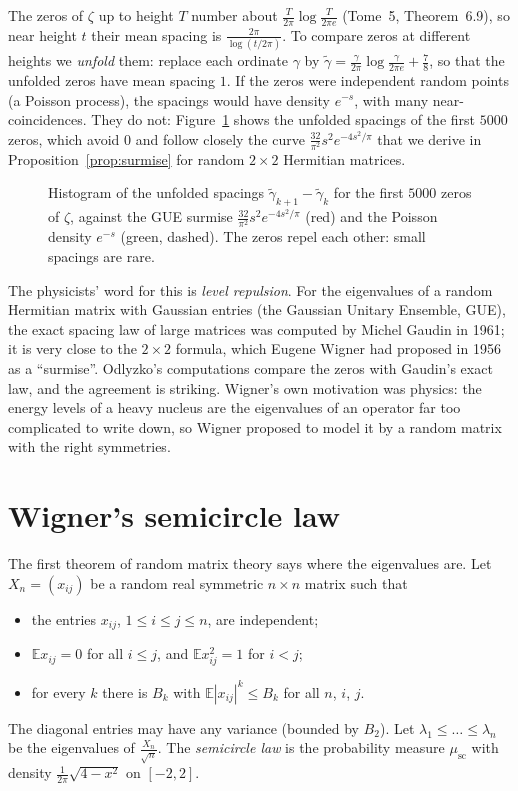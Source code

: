 The zeros of $\zeta$ up to height $T$ number about $\frac T{2\pi}\log\frac T{2\pi e}$ (Tome~5, Theorem~6.9), so near height $t$ their mean spacing is
$\frac{2\pi}{\log(t/2\pi)}$. To compare zeros at different heights we \emph{unfold} them: replace each ordinate $\gamma$ by
$\tilde\gamma=\frac\gamma{2\pi}\log\frac\gamma{2\pi e}+\frac78$, so that the unfolded zeros have mean spacing $1$. If the zeros were independent random points
(a Poisson process), the spacings would have density $e^{-s}$, with many near-coincidences. They do not: Figure~\ref{fig:spacings} shows the unfolded
spacings of the first $5000$ zeros, which avoid $0$ and follow closely the curve $\frac{32}{\pi^2}s^2e^{-4s^2/\pi}$ that we derive in
Proposition~\ref{prop:surmise} for random $2\times2$ Hermitian matrices.

\begin{figure}[ht]
\centering
{}
\caption{Histogram of the unfolded spacings $\tilde\gamma_{k+1}-\tilde\gamma_k$ for the first $5000$ zeros of $\zeta$, against the GUE surmise
$\frac{32}{\pi^2}s^2e^{-4s^2/\pi}$ (red) and the Poisson density $e^{-s}$ (green, dashed). The zeros repel each other: small spacings are rare.}
\label{fig:spacings}
\end{figure}

The physicists' word for this is \emph{level repulsion}. For the eigenvalues of a random Hermitian matrix with Gaussian entries (the Gaussian Unitary
Ensemble, GUE), the exact spacing law of large matrices was computed by Michel Gaudin in 1961; it is very close to the $2\times2$ formula, which Eugene
Wigner had proposed in 1956 as a ``surmise''. Odlyzko's computations compare the zeros with Gaudin's exact law, and the agreement is striking. Wigner's own motivation was physics: the energy levels of a heavy nucleus are the eigenvalues of an operator far too
complicated to write down, so Wigner proposed to model it by a random matrix with the right symmetries.

\section{Wigner's semicircle law}

The first theorem of random matrix theory says where the eigenvalues are. Let $X_n=(x_{ij})$ be a random real symmetric $n\times n$ matrix such that
\begin{itemize}
\item the entries $x_{ij}$, $1\le i\le j\le n$, are independent;
\item $\mathbb Ex_{ij}=0$ for all $i\le j$, and $\mathbb Ex_{ij}^2=1$ for $i<j$;
\item for every $k$ there is $B_k$ with $\mathbb E|x_{ij}|^k\le B_k$ for all $n$, $i$, $j$.
\end{itemize}
The diagonal entries may have any variance (bounded by $B_2$). Let $\lambda_1\le\dots\le\lambda_n$ be the eigenvalues of $\frac{X_n}{\sqrt n}$. The
\emph{semicircle law} is the probability measure $\mu_{\mathrm{sc}}$ with density $\frac1{2\pi}\sqrt{4-x^2}$ on $[-2,2]$.

